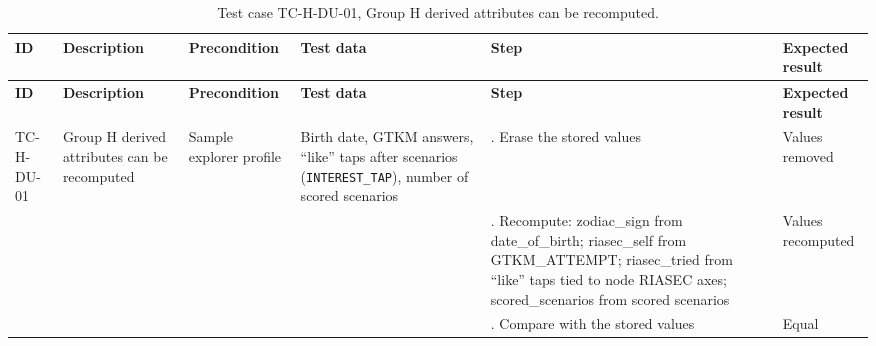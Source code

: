 {\footnotesize{}\renewcommand{\arraystretch}{1.1}
\begin{longtable}{|>{\raggedright\arraybackslash}p{}|>{\raggedright\arraybackslash}p{}|>{\raggedright\arraybackslash}p{}|>{\raggedright\arraybackslash}p{}|>{\raggedright\arraybackslash}p{}|>{\raggedright\arraybackslash}p{}|}
\caption{Test case TC-H-DU-01, Group H derived attributes can be recomputed.} \\
\hline
\textbf{ID} & \textbf{Description} & \textbf{Precondition} & \textbf{Test data} & \textbf{Step} & \textbf{Expected result} \\ \hline
\endfirsthead
\hline
\textbf{ID} & \textbf{Description} & \textbf{Precondition} & \textbf{Test data} & \textbf{Step} & \textbf{Expected result} \\ \hline
\endhead
TC-H-DU-01 & Group H derived attributes can be recomputed & Sample explorer profile & Birth date, GTKM answers, ``like'' taps after scenarios (\texttt{INTEREST\_\allowbreak{}TAP}), number of scored scenarios & 1. Erase the stored values & Values removed \\ \cline{5-6}
 &  &  &  & 2. Recompute: zodiac\_sign from date\_\allowbreak{}of\_\allowbreak{}birth; riasec\_self from GTKM\_\allowbreak{}ATTEMPT; riasec\_\allowbreak{}tried from ``like'' taps tied to node RIASEC axes; scored\_\allowbreak{}scenarios from scored scenarios & Values recomputed \\ \cline{5-6}
 &  &  &  & 3. Compare with the stored values & Equal \\ \hline
\end{longtable}
}

